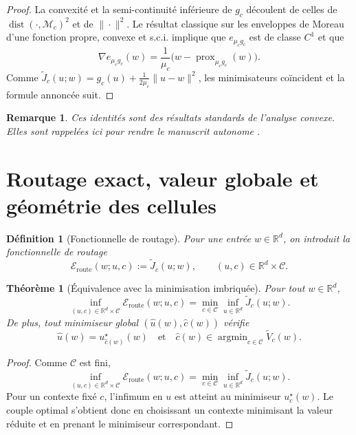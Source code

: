 \documentclass[11pt,a4paper]{article}
\newtheorem{definition}{Définition}[section]
\newtheorem{theorem}{Théorème}[section]
\newtheorem{remark}{Remarque}[section]
\DeclareMathOperator{\prox}{prox}
\DeclareMathOperator{\argmin}{argmin}
\DeclareMathOperator{\dist}{dist}
\newcommand{\R}{\mathbb R}
\newcommand{\Mcal}{\mathcal M}
\newcommand{\Ccal}{\mathcal C}
\begin{document}
\begin{proof}
La convexité et la semi-continuité inférieure de \(g_c\) découlent de celles de \(\dist(\cdot,\Mcal_c)^2\) et de \(\|\cdot\|^2\). Le résultat classique sur les enveloppes de Moreau d'une fonction propre, convexe et s.c.i. implique que \(e_{\mu_c g_c}\) est de classe \(C^1\) et que
\[
\nabla e_{\mu_c g_c}(w)=\frac{1}{\mu_c}\bigl(w-\prox_{\mu_c g_c}(w)\bigr).
\]
Comme \(\widetilde J_c(u;w)=g_c(u)+\frac{1}{2\mu_c}\|u-w\|^2\), les minimisateurs coïncident et la formule annoncée suit.
\end{proof}

\begin{remark}
Ces identités sont des résultats standards de l'analyse convexe. Elles sont rappelées ici pour rendre le manuscrit autonome \cite{Moreau1965,Rockafellar1970,BauschkeCombettes2017,RockafellarWets1998}.
\end{remark}

\section{Routage exact, valeur globale et géométrie des cellules}

\begin{definition}[Fonctionnelle de routage]
Pour une entrée \(w\in\R^d\), on introduit la fonctionnelle de routage
\[
\mathcal E_{\mathrm{route}}(w;u,c):=\widetilde J_c(u;w),
\qquad
(u,c)\in \R^d\times\Ccal.
\]
\end{definition}

\begin{theorem}[Équivalence avec la minimisation imbriquée]
Pour tout \(w\in\R^d\),
\[
\inf_{(u,c)\in \R^d\times\Ccal}\mathcal E_{\mathrm{route}}(w;u,c)
=
\min_{c\in\Ccal}\inf_{u\in\R^d}\widetilde J_c(u;w).
\]
De plus, tout minimiseur global \((\hat u(w),\hat c(w))\) vérifie
\[
\hat u(w)=u_{\hat c(w)}^\star(w)
\quad\text{et}\quad
\hat c(w)\in\argmin_{c\in\Ccal}\widetilde V_c(w).
\]
\end{theorem}

\begin{proof}
Comme \(\Ccal\) est fini,
\[
\inf_{(u,c)\in \R^d\times\Ccal}\mathcal E_{\mathrm{route}}(w;u,c)
=
\min_{c\in\Ccal}\inf_{u\in\R^d}\widetilde J_c(u;w).
\]
Pour un contexte fixé \(c\), l'infimum en \(u\) est atteint au minimiseur \(u_c^\star(w)\). Le couple optimal s'obtient donc en choisissant un contexte minimisant la valeur réduite et en prenant le minimiseur correspondant.
\end{proof}
\end{document}
